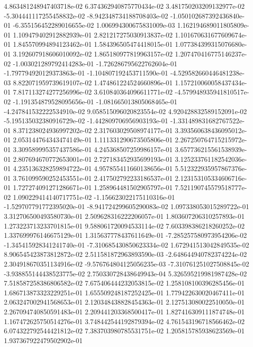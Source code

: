 4.863481248947403718e-02
6.374362940875770434e-02
3.481750203209132977e-02
-5.304441117255458832e-02
-8.942348734188708403e-02
-1.050102687392436840e-01
-6.355156452289016655e-02
1.006994300675831009e-03
1.162194689011805809e-01
1.109479402912882939e-01
2.821217275030913837e-02
1.101670631677609674e-01
1.845570994894123462e-01
1.584396505474418015e-01
1.077384399315076680e-01
3.192607918606010092e-02
1.865180977819963157e-02
1.207470416775146237e-02
-1.003021289792414283e-01
-1.726286795622762604e-01
-1.797794920129373863e-01
-1.104807192453711590e-01
-4.529582660446481238e-03
8.822071959739619107e-02
1.474861224524660896e-01
1.157210060058437434e-01
7.817113274277256996e-02
3.610840364096611771e-02
-4.579948935941810517e-02
-1.191354879528095656e-01
-1.081665013805068465e-01
-4.247841532222534910e-02
9.058515096020823554e-02
4.920428832589152091e-02
-5.195135032380916729e-02
-1.442809706956903193e-01
-1.331489831682767522e-01
8.371238024936997202e-02
2.317603029508974177e-01
3.393560638436095012e-01
2.053144764343474149e-01
1.111331290673505806e-01
2.267250764715215972e-01
3.309589995357437586e-01
4.245368507259986157e-01
3.657736215561538939e-01
2.807694670772653001e-01
2.727183452935699193e-01
3.125233761182542036e-01
4.235136328259894722e-01
4.957855411660138656e-01
5.512322935957867376e-01
3.761099590252453551e-01
2.417502792233186537e-01
2.123153105334606716e-01
1.727274091271286671e-01
1.258964481502905797e-01
7.521190745579518777e-02
1.090229414140717751e-02
-1.156623022175110316e-01
-1.529707791772395020e-01
-8.941724299605290083e-02
1.097338053015289722e-01
3.312706500493580730e-01
2.509628316222206057e-01
1.803607206310257893e-01
1.273223713233701815e-01
9.588061720094533114e-02
7.603398386218260252e-02
1.337699976146675129e-01
1.315637778437611649e-01
-7.285257580973954206e-02
-1.345415928341241740e-01
-7.310685430850623334e-02
1.672941513042849535e-02
8.906545423873812872e-02
2.511581872963893590e-03
-2.648644940782374224e-02
2.304918670351134916e-02
-9.576764804125056235e-03
-7.310761251027508845e-02
-3.938855144438523775e-02
2.750330728438649943e-04
5.326595219981987428e-02
7.518587258386806582e-02
7.675406444232053815e-02
1.258108100396285456e-01
1.686713873323229251e-01
1.655509248187252425e-01
1.779422630020467411e-01
2.063247002941568653e-01
2.120348438828454363e-01
2.127513080022510050e-01
2.267094740850591483e-01
2.209441203368500417e-01
1.827416309111874748e-01
1.167472625750514276e-01
3.748442544192879394e-02
4.761543196718566462e-02
6.074322792544421812e-02
7.383703980785531751e-02
1.205815785938623569e-01
1.937367922479502902e-01
